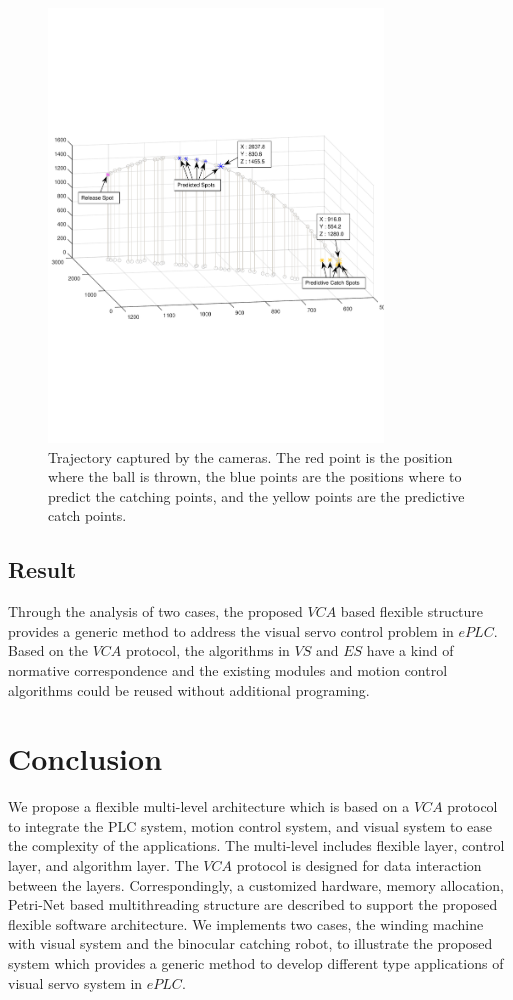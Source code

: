 \documentclass[journal,UTF8]{IEEEtran}
\begin{document}
\begin{figure}
	\centering
	\includegraphics[width=3.5in]{fig/PFofRobot.pdf}
	\caption{ Trajectory captured by the cameras. The red point is the position where the ball is thrown, the blue points are the positions where to predict the catching points, and the yellow points are the predictive catch points.}
	\label{fig:Trajectory}
\end{figure}

\subsection{Result}
Through the analysis of two cases, the proposed $VCA$ based flexible structure provides a generic method to address the visual servo control problem in $ePLC$. Based on the $VCA$ protocol, the algorithms in $VS$ and $ES$ have a kind of normative correspondence and the existing modules and motion control algorithms could be reused without additional programing. 
\section{Conclusion}
\label{conclusion}
We propose a flexible multi-level architecture which is based on a $VCA$ protocol to integrate the PLC system, motion control system, and visual system to ease the complexity of the applications. The multi-level includes flexible layer, control layer, and algorithm layer. The $VCA$ protocol is designed for data interaction between the layers. Correspondingly, a customized hardware, memory allocation, Petri-Net based multithreading structure are described to support the proposed flexible software architecture. We implements two cases, the winding machine with visual system and the binocular catching robot, to illustrate the proposed system which provides a generic method to develop different type applications of visual servo system in $ePLC$.
\end{document}
